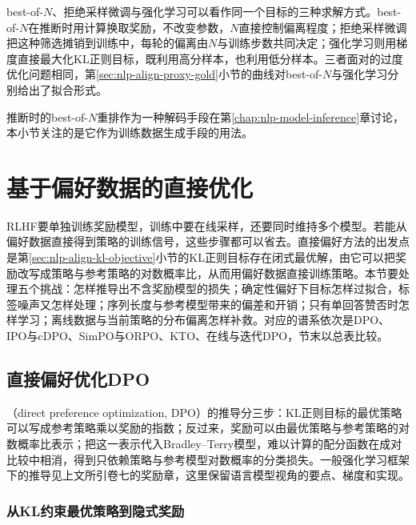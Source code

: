 best-of-$N$、拒绝采样微调与强化学习可以看作同一个目标的三种求解方式。best-of-$N$在推断时用计算换取奖励，不改变参数，$N$直接控制偏离程度；拒绝采样微调把这种筛选摊销到训练中，每轮的偏离由$N$与训练步数共同决定；强化学习则用梯度直接最大化KL正则目标，既利用高分样本，也利用低分样本。三者面对的过度优化问题相同，第\ref{sec:nlp-align-proxy-gold}小节的曲线对best-of-$N$与强化学习分别给出了拟合形式。

推断时的best-of-$N$重排作为一种解码手段在第\ref{chap:nlp-model-inference}章讨论，本小节关注的是它作为训练数据生成手段的用法。

\section{基于偏好数据的直接优化}
\label{sec:nlp-align-direct}

RLHF要单独训练奖励模型，训练中要在线采样，还要同时维持多个模型。若能从偏好数据直接得到策略的训练信号，这些步骤都可以省去。直接偏好方法的出发点是第\ref{sec:nlp-align-kl-objective}小节的KL正则目标存在闭式最优解，由它可以把奖励改写成策略与参考策略的对数概率比，从而用偏好数据直接训练策略。本节要处理五个挑战：怎样推导出不含奖励模型的损失；确定性偏好下目标怎样过拟合，标签噪声又怎样处理；序列长度与参考模型带来的偏差和开销；只有单回答赞否时怎样学习；离线数据与当前策略的分布偏离怎样补救。对应的谱系依次是DPO、IPO与cDPO、SimPO与ORPO、KTO、在线与迭代DPO，节末以总表比较。

\subsection{直接偏好优化DPO}
\label{sec:nlp-align-dpo}

（direct preference optimization, DPO）的推导分三步\cite{rafailov2023dpo}：KL正则目标的最优策略可以写成参考策略乘以奖励的指数；反过来，奖励可以由最优策略与参考策略的对数概率比表示；把这一表示代入Bradley--Terry模型，难以计算的配分函数在成对比较中相消，得到只依赖策略与参考模型对数概率的分类损失。一般强化学习框架下的推导见上文所引卷七的奖励章，这里保留语言模型视角的要点、梯度和实现。

\subsubsection{从KL约束最优策略到隐式奖励}
\label{sec:nlp-align-dpo-implicit}

